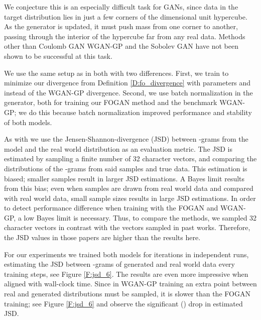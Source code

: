 \documentclass{article}
\begin{document}
 We conjecture this is an especially difficult task for GANs, since data in the target distribution lies in just a few corners of
 the  dimensional unit hypercube. As the generator is updated, it must push mass from one corner to another, passing through
 the interior of the hypercube far from any real data. Methods other than Coulomb GAN \cite{unterthiner2017coulomb}
 WGAN-GP \cite{gulrajani2017improved,heusel2017gans} and the Sobolev GAN \cite{mroueh2017sobolev}
 have not been shown to be successful at this task.
 
 We use the same setup as in both \cite{gulrajani2017improved,heusel2017gans}
 with two differences.
 First, we train to minimize our divergence
 from Definition \ref{D:fo_divergence} with parameters  and  instead of the WGAN-GP divergence.
 Second, we use batch normalization in the generator, both for training our FOGAN method and the benchmark WGAN-GP;
 we do this because batch normalization improved performance and stability of both models.
 
 As with \cite{gulrajani2017improved,heusel2017gans} we use the Jensen-Shannon-divergence (JSD) between -grams from the model and the real world distribution
 as an evaluation metric.
 The JSD is estimated by sampling a finite number of 32 character vectors,
 and comparing the distributions of the -grams from said samples and true data.
 This estimation is biased; smaller samples result in larger JSD estimations.
 A Bayes limit results from this bias;
 even when samples are drawn from real world data and compared with real world data, small sample sizes results in large JSD estimations.
 In order to detect performance difference when training with the FOGAN and WGAN-GP, a low Bayes limit is necessary.
 Thus, to compare the methods, we sampled  32 character vectors in contrast with
 the  vectors sampled in past works. Therefore, the JSD values in those papers are higher than the results here.
 
 For our experiments we trained both models for  iterations in  independent runs, estimating the JSD between -grams
 of generated and real world data every  training steps, see Figure \ref{F:jsd_6}.
 The results are even more impressive when
 aligned with wall-clock time. Since in WGAN-GP training an extra point between real and generated distributions must be sampled, it is slower
 than the FOGAN training; see Figure \ref{F:jsd_6}
 and observe the significant () drop in estimated JSD.
 
\end{document}
